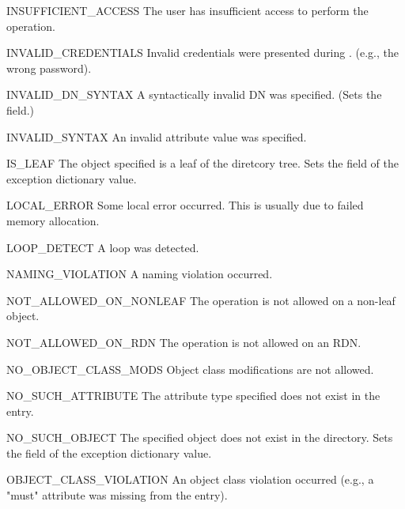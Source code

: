 \begin{excdesc}{INSUFFICIENT_ACCESS}
	   The user has  insufficient  access  to perform the operation.
\end{excdesc}
\begin{excdesc}{INVALID_CREDENTIALS}
	Invalid   credentials  were  presented during .
	(e.g., the wrong password).
\end{excdesc}
\begin{excdesc}{INVALID_DN_SYNTAX}
	   A syntactically invalid DN was  specified.
	(Sets the  field.)
\end{excdesc}
\begin{excdesc}{INVALID_SYNTAX}
	An  invalid attribute value was specified.
\end{excdesc}
\begin{excdesc}{IS_LEAF}
	The object specified is a leaf of the diretcory tree.
	Sets the  field of the exception dictionary value.
\end{excdesc}
\begin{excdesc}{LOCAL_ERROR}
	Some local error  occurred.
	This is usually due to failed memory allocation.
\end{excdesc}
\begin{excdesc}{LOOP_DETECT}
	A loop was detected.
\end{excdesc}
\begin{excdesc}{NAMING_VIOLATION}
	A naming violation occurred.
\end{excdesc}
\begin{excdesc}{NOT_ALLOWED_ON_NONLEAF}
	The operation is not allowed on a non-leaf object.
\end{excdesc}
\begin{excdesc}{NOT_ALLOWED_ON_RDN}
	The  operation  is  not  allowed on an RDN.
\end{excdesc}
\begin{excdesc}{NO_OBJECT_CLASS_MODS}
	Object  class  modifications  are  not allowed.
\end{excdesc}
\begin{excdesc}{NO_SUCH_ATTRIBUTE}
	The  attribute type specified does not exist in the entry.
\end{excdesc}
\begin{excdesc}{NO_SUCH_OBJECT}
	The specified object does not exist in the directory.
	Sets the  field of the exception dictionary value.
\end{excdesc}
\begin{excdesc}{OBJECT_CLASS_VIOLATION}
	An  object  class  violation  occurred (e.g.,  
	a "must" attribute was missing from the entry).
\end{excdesc}
